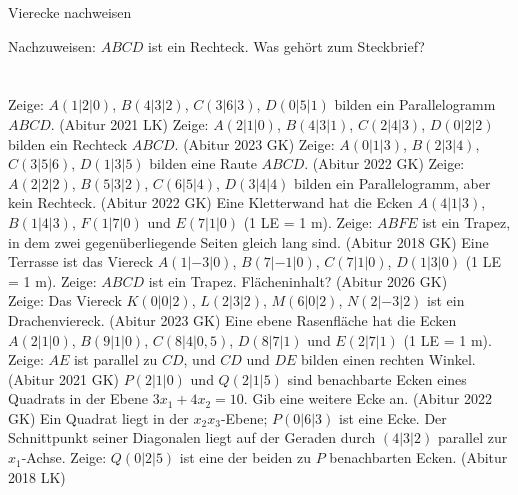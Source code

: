 \setcounter{aufgabe}{16}

\begin{aufgabe}{Vierecke nachweisen}
\begin{teile}
\teil Nachzuweisen: $ABCD$ ist ein Rechteck. Was gehört zum Steckbrief? \\  \\  \\ 
\teil Zeige: $A(1 | 2 | 0)$, $B(4 | 3 | 2)$, $C(3 | 6 | 3)$, $D(0 | 5 | 1)$ bilden ein Parallelogramm $ABCD$. \hfill (Abitur 2021 LK)
\teil Zeige: $A(2 | 1 | 0)$, $B(4 | 3 | 1)$, $C(2 | 4 | 3)$, $D(0 | 2 | 2)$ bilden ein Rechteck $ABCD$. \hfill (Abitur 2023 GK)
\teil Zeige: $A(0 | 1 | 3)$, $B(2 | 3 | 4)$, $C(3 | 5 | 6)$, $D(1 | 3 | 5)$ bilden eine Raute $ABCD$. \hfill (Abitur 2022 GK)
\teil Zeige: $A(2 | 2 | 2)$, $B(5 | 3 | 2)$, $C(6 | 5 | 4)$, $D(3 | 4 | 4)$ bilden ein Parallelogramm, aber kein Rechteck. \hfill (Abitur 2022 GK)
\teil Eine Kletterwand hat die Ecken $A(4 | 1 | 3)$, $B(1 | 4 | 3)$, $F(1 | 7 | 0)$ und $E(7 | 1 | 0)$ (1 LE = 1 m). Zeige: $ABFE$ ist ein Trapez, in dem zwei gegenüberliegende Seiten gleich lang sind. \hfill (Abitur 2018 GK)
\teil Eine Terrasse ist das Viereck $A(1 | -3 | 0)$, $B(7 | -1 | 0)$, $C(7 | 1 | 0)$, $D(1 | 3 | 0)$ (1 LE = 1 m). Zeige: $ABCD$ ist ein Trapez. Flächeninhalt? \hfill (Abitur 2026 GK) \\ \leerfeld[m²]
\teil Zeige: Das Viereck $K(0 | 0 | 2)$, $L(2 | 3 | 2)$, $M(6 | 0 | 2)$, $N(2 | -3 | 2)$ ist ein Drachenviereck. \hfill (Abitur 2023 GK)
\teil Eine ebene Rasenfläche hat die Ecken $A(2 | 1 | 0)$, $B(9 | 1 | 0)$, $C(8 | 4 | 0{,}5)$, $D(8 | 7 | 1)$ und $E(2 | 7 | 1)$ (1 LE = 1 m). Zeige: $AE$ ist parallel zu $CD$, und $CD$ und $DE$ bilden einen rechten Winkel. \hfill (Abitur 2021 GK)
\teil $P(2 | 1 | 0)$ und $Q(2 | 1 | 5)$ sind benachbarte Ecken eines Quadrats in der Ebene $3x_1 + 4x_2 = 10$. Gib eine weitere Ecke an. \hfill (Abitur 2022 GK)
\teil Ein Quadrat liegt in der $x_2x_3$-Ebene; $P(0 | 6 | 3)$ ist eine Ecke. Der Schnittpunkt seiner Diagonalen liegt auf der Geraden durch $(4 | 3 | 2)$ parallel zur $x_1$-Achse. Zeige: $Q(0 | 2 | 5)$ ist eine der beiden zu $P$ benachbarten Ecken. \hfill (Abitur 2018 LK)
\end{teile}
\end{aufgabe}

